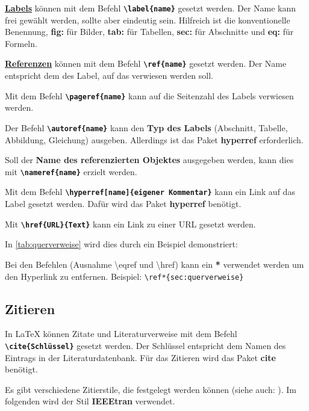 \underline{\textbf{Labels}} können mit dem Befehl \textbf{\texttt{\textbackslash label\{name\}}} gesetzt werden. Der Name kann frei gewählt werden, sollte aber eindeutig sein. Hilfreich ist die konventionelle Benennung, \textbf{fig:} für Bilder, \textbf{tab:} für Tabellen, \textbf{sec:} für Abschnitte und \textbf{eq:} für Formeln.

\underline{\textbf{Referenzen}} können mit dem Befehl \textbf{\texttt{\textbackslash ref\{name\}}} gesetzt werden. Der Name entspricht dem des Label, auf das verwiesen werden soll.

Mit dem Befehl \textbf{\texttt{\textbackslash pageref\{name\}}} kann auf die Seitenzahl des Labels verwiesen werden.

Der Befehl \textbf{\texttt{\textbackslash autoref\{name\}}} kann den \textbf{Typ des Labels} (Abschnitt, Tabelle, Abbildung, Gleichung) ausgeben. Allerdings ist das Paket \textbf{hyperref} erforderlich.

Soll der \textbf{Name des referenzierten Objektes} ausgegeben werden, kann dies mit \textbf{\texttt{\textbackslash nameref\{name\}}} erzielt werden.

Mit dem Befehl \textbf{\texttt{\textbackslash hyperref[name]\{eigener Kommentar\}}} kann ein Link auf das Label gesetzt werden. Dafür wird das Paket \textbf{hyperref} benötigt.

Mit \textbf{\texttt{\textbackslash href\{URL\}\{Text\}}} kann ein Link zu einer URL gesetzt werden.

In \autoref{tab:querverweise} wird dies durch ein Beispiel demonstriert:


Bei den Befehlen (Ausnahme \textbackslash eqref und \textbackslash href) kann ein \textbf{*} verwendet werden um den Hyperlink zu entfernen. Beispiel: \texttt{\textbackslash ref*\{sec:querverweise\}}


\subsection{Zitieren}
\label{sec:zitieren}
In \LaTeX{} können Zitate und Literaturverweise mit dem Befehl \textbf{\texttt{\textbackslash cite\{Schlüssel\}}} gesetzt werden. Der Schlüssel entspricht dem Namen des Eintrags in der Literaturdatenbank.
Für das Zitieren wird das Paket \textbf{cite} benötigt.

Es gibt verschiedene Zitierstile, die festgelegt werden können (siehe auch: ). Im folgenden wird der Stil \textbf{IEEEtran} verwendet.

